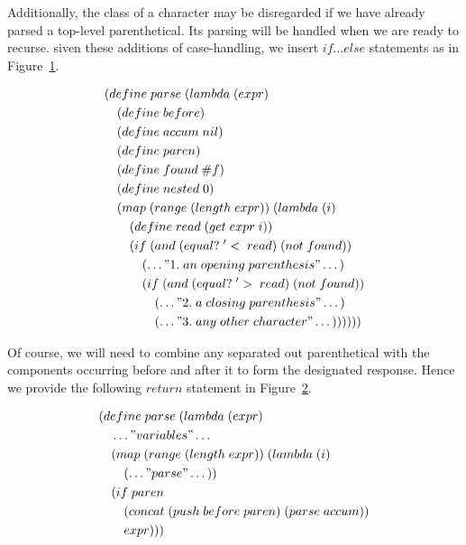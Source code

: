 Additionally, the class of a character may be disregarded if we have already
parsed a top-level parenthetical. Its parsing will be handled when we are ready
to recurse. siven these additions of case-handling, we insert $if \dots else$
statements as in Figure~\ref{fig:imperParseApproach}.

\begin{figure}[htp]
\caption{}\label{fig:imperParseApproach}
\begin{align*}
& (define \; parse \; (lambda \; (expr) \; 
\\& \quad (define \; before)
\\& \quad (define \; accum \; nil)
\\& \quad (define \; paren)
\\& \quad (define \; found \; \#f)
\\& \quad (define \; nested \; 0)
\\& \quad (map \; (range \; (length \; expr)) \; (lambda \; (i)
\\& \qquad (define \; read \; (get \; expr \; i))
\\& \qquad (if \; (and \; (equal? \; '< \; read) \; (not \; found))
\\& \qquad \quad (\dots"1. \; an \; opening \; parenthesis"\dots)
\\& \qquad \quad (if \; (and \; (equal? \; '> \; read) \; (not \; found))
\\& \qquad \qquad (\dots"2. \; a \; closing \; parenthesis"\dots)
\\& \qquad \qquad (\dots"3. \; any \; other \; character"\dots))))))
\end{align*}
\end{figure}

Of course, we will need to combine any separated out parenthetical with the components 
occurring before and after it to form the designated response. Hence we provide the 
following $return$ statement in Figure~\ref{fig:postscriptReturn}.

\begin{figure}[htp]
\caption{}\label{fig:postscriptReturn}
\begin{align*}
& (define \; parse \; (lambda \; (expr) \; 
\\& \quad \dots"variables"\dots
\\& \quad (map \; (range \; (length \; expr)) \; (lambda \; (i)
\\& \qquad (\dots"parse"\dots))
\\& \quad (if \; paren
\\& \qquad (concat \; (push \; before \; paren) \; (parse \; accum))
\\& \qquad expr)))
\end{align*}
\end{figure}

